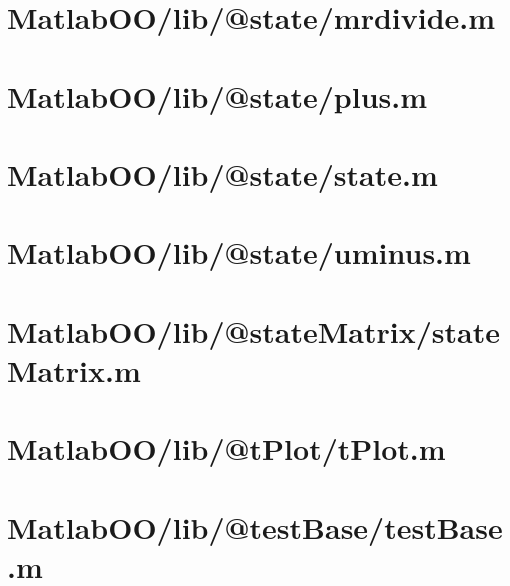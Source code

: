 \pagebreak
\section{MatlabOO/lib/@state/mrdivide.m}\label{code:MatlabOO/lib/@state/mrdivide.m}


\pagebreak
\section{MatlabOO/lib/@state/plus.m}\label{code:MatlabOO/lib/@state/plus.m}


\pagebreak
\section{MatlabOO/lib/@state/state.m}\label{code:MatlabOO/lib/@state/state.m}


\pagebreak
\section{MatlabOO/lib/@state/uminus.m}\label{code:MatlabOO/lib/@state/uminus.m}


\pagebreak
\section{MatlabOO/lib/@stateMatrix/stateMatrix.m}\label{code:MatlabOO/lib/@stateMatrix/stateMatrix.m}


\pagebreak
\section{MatlabOO/lib/@tPlot/tPlot.m}\label{code:MatlabOO/lib/@tPlot/tPlot.m}


\pagebreak
\section{MatlabOO/lib/@testBase/testBase.m}\label{code:MatlabOO/lib/@testBase/testBase.m}


